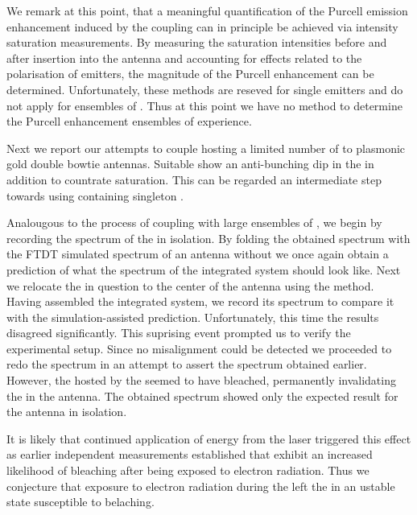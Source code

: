    We remark at this point, that a meaningful quantification of the Purcell emission enhancement induced by the coupling can in principle be achieved via intensity saturation measurements. By measuring the saturation intensities before and after insertion into the antenna and accounting for effects related to the polarisation of emitters, the magnitude of the Purcell enhancement can be determined. Unfortunately, these methods are reseved for single emitters and do not apply for ensembles of \sivs. Thus at this point we have no method to determine the Purcell enhancement ensembles of \sivs experience.


   Next we report our attempts to couple \nds hosting a limited number of \sivs to plasmonic gold double bowtie antennas. Suitable \nds show an anti-bunching dip in the \gtf in addition to countrate saturation. This can be regarded an intermediate step towards using \nds containing singleton \sivs.

   Analougous to the process of coupling \nds with large ensembles of \sivs, we begin by recording the spectrum of the \nd in isolation. By folding the obtained spectrum with the FTDT simulated spectrum of an antenna without \nd we once again obtain a prediction of what the spectrum of the integrated system should look like. Next we relocate the \nd in question to the center of the antenna using the \pp method. Having assembled the integrated system, we record its spectrum to compare it with the simulation-assisted prediction. Unfortunately, this time the results disagreed significantly. This suprising event prompted us to verify the experimental setup. Since no misalignment could be detected we proceeded to redo the spectrum in an attempt to assert the spectrum obtained earlier. However, the \sivs hosted by the \nd seemed to have bleached, permanently invalidating the \nd in the antenna. The obtained spectrum showed only the expected result for the antenna in isolation.

   It is likely that continued application of energy from the laser triggered this effect as earlier independent measurements established that \sivs exhibit an increased likelihood of bleaching after being exposed to electron radiation. Thus we conjecture that exposure to electron radiation during the \pp left the \sivs in an ustable state susceptible to belaching.

